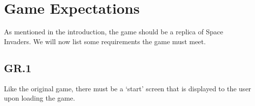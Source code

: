 \documentclass[12pt, letterpaper]{article}
\begin{document}
    
    
    \section{Game Expectations}
    
    As mentioned in the introduction, the game should be a replica of Space Invaders. We will now list some requirements the game must meet. 
    
    \subsection*{GR.1}
    
    Like the original game, there must be a `start' screen that is displayed to the user upon loading the game. 
    
\end{document}
